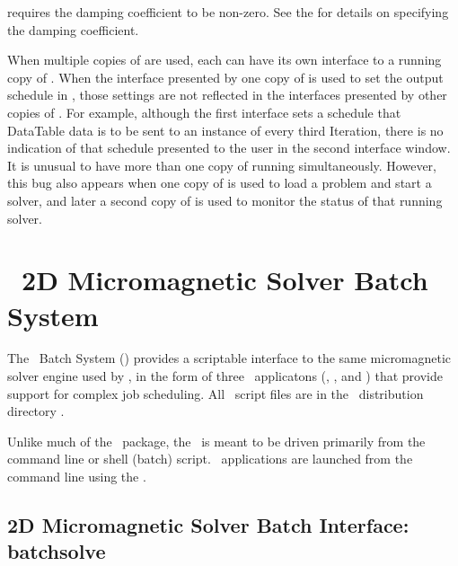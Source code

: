  requires the damping coefficient to be non-zero.
See the  for details on specifying the damping
coefficient.

When multiple copies of
are used, each can have its own interface to a running copy of
.  When the interface presented by one copy of
 is used to set the output schedule in ,
those settings are not reflected in the interfaces presented by other
copies of .  For example, although the first interface
sets a schedule that DataTable data is to be sent to an instance of
 every third Iteration, there is
no indication of that schedule presented to the user in the second
interface window.  It is unusual to have more than one copy of
 running simultaneously. However, this bug also appears
when one copy of  is used to load a problem and start a
solver, and later a second copy of  is used to monitor the
status of that running solver.

\section{\OOMMF\ 2D Micromagnetic Solver Batch System}\label{sec:obs}

The \OOMMF\ Batch System (\OBS) provides a scriptable interface
to the same micromagnetic solver engine used by
, in the
form of three \Tcl\ applicatons
(, , and
) that provide support for complex job scheduling.
All \OBS\ script files are in the \OOMMF\ distribution directory
.

Unlike much of the \OOMMF\ package, the \OBS\ is meant to be
driven primarily from the command line or shell (batch) script.
\OBS\ applications are launched from the command line using the
.

\subsection{2D Micromagnetic Solver Batch Interface: batchsolve}%
\label{sec:batchsolve}

